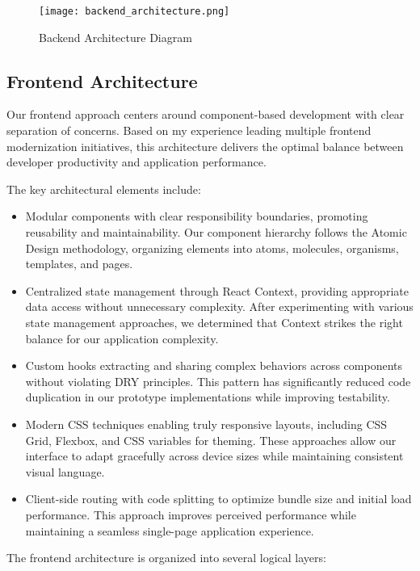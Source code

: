 \documentclass[12pt,a4paper]{article}
\begin{document}
\begin{figure}[H]
\centering
\texttt{[image: backend\_architecture.png]}
\caption{Backend Architecture Diagram}
\label{fig:backend-architecture}
\end{figure}

\subsection{Frontend Architecture}

Our frontend approach centers around component-based development with clear separation of concerns. Based on my experience leading multiple frontend modernization initiatives, this architecture delivers the optimal balance between developer productivity and application performance.

The key architectural elements include:

\begin{itemize}
    \item Modular components with clear responsibility boundaries, promoting reusability and maintainability. Our component hierarchy follows the Atomic Design methodology, organizing elements into atoms, molecules, organisms, templates, and pages.
    \item Centralized state management through React Context, providing appropriate data access without unnecessary complexity. After experimenting with various state management approaches, we determined that Context strikes the right balance for our application complexity.
    \item Custom hooks extracting and sharing complex behaviors across components without violating DRY principles. This pattern has significantly reduced code duplication in our prototype implementations while improving testability.
    \item Modern CSS techniques enabling truly responsive layouts, including CSS Grid, Flexbox, and CSS variables for theming. These approaches allow our interface to adapt gracefully across device sizes while maintaining consistent visual language.
    \item Client-side routing with code splitting to optimize bundle size and initial load performance. This approach improves perceived performance while maintaining a seamless single-page application experience.
\end{itemize}

The frontend architecture is organized into several logical layers:
\end{document}
